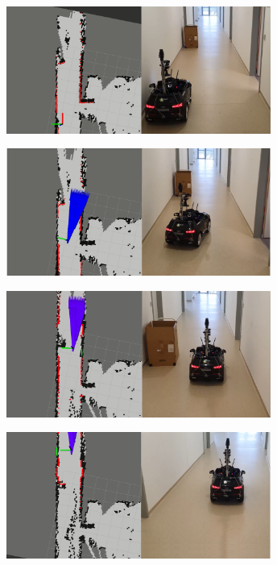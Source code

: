 \begin{minipage}{\textwidth}
    \centering
    \includegraphics[width=0.65\textwidth]{figures/raw/local_planner_real_test_joined_straight_traj_1_static_obj_1.png}
    
    \vspace{0.5cm}
    \centering
    \includegraphics[width=0.65\textwidth]{figures/raw/local_planner_real_test_joined_straight_traj_1_static_obj_2.png}
    
    \vspace{0.5cm}
    \centering
    \includegraphics[width=0.65\textwidth]{figures/raw/local_planner_real_test_joined_straight_traj_1_static_obj_3.png}
    
    \vspace{0.5cm}
    \centering
    \includegraphics[width=0.65\textwidth]{figures/raw/local_planner_real_test_joined_straight_traj_1_static_obj_4.png}
    
    \label{local_planner_real_test_joined_straight_traj_1_static_obj}
\end{minipage}

